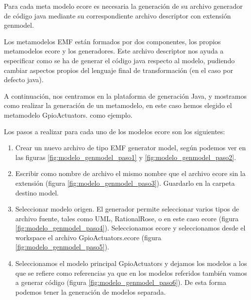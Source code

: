 Para cada meta modelo \gls{ecore} es necesaria la generación de su archivo generador de código java mediante su correspondiente archivo descriptor con extensión genmodel.

Los metamodelos EMF están formados por dos componentes, los propios metamodelos \gls{ecore} y los generadores. Este archivo descriptor nos ayuda a especificar como se ha de generar el código java respecto al modelo, pudiendo cambiar aspectos propios del lenguaje final de transformación (en el caso por defecto java).

A continuación, nos centramos en la plataforma de generación Java, y mostramos como realizar la generación de un \gls{metamodelo}, en este caso hemos elegido el \gls{metamodelo} GpioActuators. como ejemplo.

Los pasos a realizar para cada uno de los modelos \gls{ecore} son los siguientes:

\begin{enumerate}

\item Crear un nuevo archivo de tipo EMF generator model, según podemos ver en las figuras \ref{fig:modelo_genmodel_paso1} y \ref{fig:modelo_genmodel_paso2}. 
\item Escribir como nombre de archivo el mismo nombre que el archivo \gls{ecore} sin la extensión (figura  \ref{fig:modelo_genmodel_paso3}). Guardarlo en la carpeta destino model.

\item Seleccionar modelo origen. El generador permite seleccionar varios tipos de archivo fuente, tales como UML, RationalRose, o en este caso \gls{ecore} (figura  \ref{fig:modelo_genmodel_paso4}). Seleccionamos \gls{ecore} y seleccionamos desde el workspace el archivo GpioActuators.ecore (figura \ref{fig:modelo_genmodel_paso5}).

\item Seleccionamos el modelo principal GpioActuators y dejamos los modelos a los que se refiere como referencias ya que en los modelos referidos también vamos a generar código (figura \ref{fig:modelo_genmodel_paso6}). De esta forma podemos tener la generación de modelos separada.

\end{enumerate}

